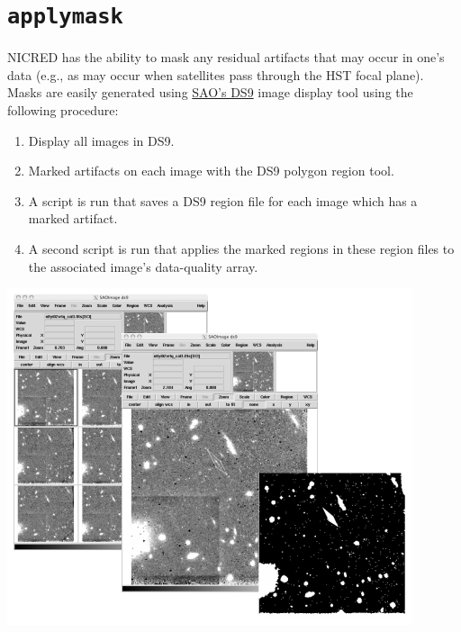 \documentclass[letterpaper,10pt,english]{sphinxmanual}
\begin{document}

\section{\texttt{applymask}}
\label{modules:index-7}\label{modules:applymask}
NICRED has the ability to mask any residual artifacts that may occur in one's
data (e.g., as may occur when satellites pass through the HST focal plane).
Masks are easily generated using \href{http://http://hea-www.harvard.edu/RD/ds9}{SAO’s DS9}
image display tool using the following procedure:
\begin{enumerate}
\item {} 
Display all  images in DS9.

\item {} 
Marked artifacts on each image with the DS9 polygon region tool.

\item {} 
A script is run that saves a DS9 region file for each image which has a marked artifact.

\item {} 
A second script is run that applies the marked regions in these region files to the associated image’s data-quality array.

\end{enumerate}

{\hfill\includegraphics{applymask.png}\hfill}
\end{document}
